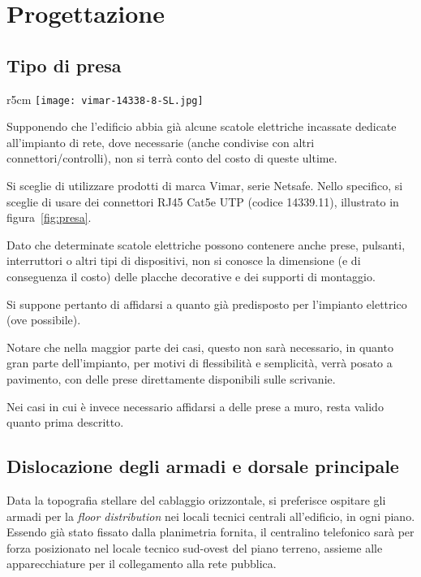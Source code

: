 %

\newpage
\section{Progettazione}
\subsection{Tipo di presa}

\begin{wrapfigure}{r}{5cm}
  \centering
  \texttt{[image: vimar-14338-8-SL.jpg]}
  \caption{Il connettore scelto per le prese utente.}\label{fig:presa}
\end{wrapfigure}

Supponendo che l'edificio abbia già alcune scatole elettriche incassate dedicate all'impianto di rete,
dove necessarie (anche condivise con altri connettori/controlli), non si terrà conto del costo di queste ultime.

Si sceglie di utilizzare prodotti di marca Vimar, serie Netsafe.
Nello specifico, si sceglie di usare dei connettori RJ45 Cat5e UTP (codice 14339.11), illustrato in figura~\ref{fig:presa}.

Dato che determinate scatole elettriche possono contenere anche prese, pulsanti, interruttori o altri tipi
di dispositivi, non si conosce la dimensione (e di conseguenza il costo) delle placche decorative e dei supporti di montaggio.

Si suppone pertanto di affidarsi a quanto già predisposto per l'impianto elettrico (ove possibile).

Notare che nella maggior parte dei casi, questo non sarà necessario, in quanto gran parte dell'impianto,
per motivi di flessibilità e semplicità, verrà posato a pavimento, con delle prese direttamente disponibili sulle scrivanie.

Nei casi in cui è invece necessario affidarsi a delle prese a muro, resta valido quanto prima descritto.

\subsection{Dislocazione degli armadi e dorsale principale}

Data la topografia stellare del cablaggio orizzontale, si preferisce ospitare gli armadi per la \textit{floor distribution}
nei locali tecnici centrali all'edificio, in ogni piano. Essendo già stato fissato dalla planimetria fornita, il centralino
telefonico sarà per forza posizionato nel locale tecnico sud-ovest del piano terreno, assieme alle apparecchiature per
il collegamento alla rete pubblica.

